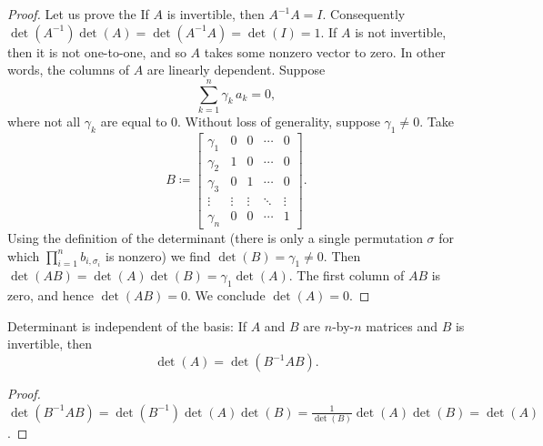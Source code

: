 \begin{proof}
Let us prove the
If $A$ is invertible,
then $A^{-1}A = I$.
Consequently $\det(A^{-1})\det(A) = \det(A^{-1}A) = \det(I) = 1$.
If $A$ is not invertible, then it is not one-to-one, and so $A$ takes
some nonzero vector to zero.
In other words, the columns of $A$ are linearly dependent.
Suppose 
\begin{equation*}
\sum_{k=1}^n \gamma_k\, a_k = 0 ,
\end{equation*}
where not all $\gamma_k$ are equal to 0.
Without loss of generality, suppose $\gamma_1\neq 0$.
Take
\begin{equation*}
B \coloneqq 
\begin{bmatrix}
\gamma_1 & 0 & 0 & \cdots & 0 \\
\gamma_2 & 1 & 0 & \cdots & 0 \\
\gamma_3 & 0 & 1 & \cdots & 0 \\
\vdots & \vdots & \vdots & \ddots & \vdots \\
\gamma_n & 0 & 0 & \cdots & 1
\end{bmatrix} .
\end{equation*}
Using the definition of the determinant (there is only a single
permutation $\sigma$ for which $\prod_{i=1}^n b_{i,\sigma_i}$ is nonzero)
we find $\det(B) = \gamma_1 \not= 0$.
Then
$\det(AB) = \det(A)\det(B) = \gamma_1\det(A)$.
The first column of $AB$ is zero, and hence $\det(AB) = 0$.  We conclude
$\det(A) = 0$.
\end{proof}

\begin{prop}
Determinant is independent of the basis:  If $A$ and $B$ are
$n$-by-$n$ matrices and $B$ is
invertible, then
\begin{equation*}
\det(A) = \det(B^{-1}AB) .
\end{equation*}
\end{prop}

\begin{proof}
$\det(B^{-1}AB) = 
\det(B^{-1})\det(A)\det(B) =
\frac{1}{\det(B)}\det(A)\det(B) = \det(A)$.
\end{proof}

